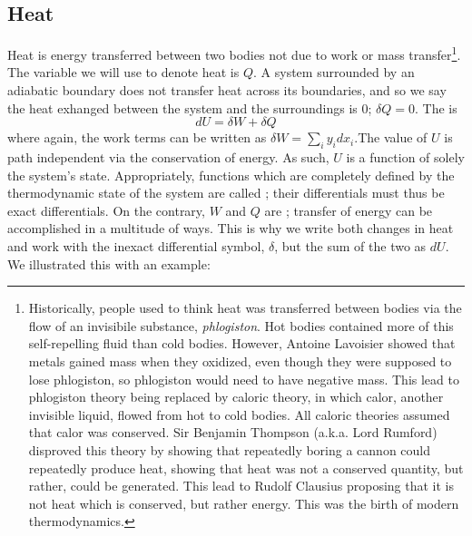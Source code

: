\documentclass[12pt]{article}
\begin{document}
\subsection{Heat}
Heat is energy transferred between two bodies not due to work or mass transfer\footnote{Historically, people used to think heat was transferred between bodies via the flow of an invisibile substance, \textit{phlogiston}. Hot bodies contained more of this self-repelling fluid than cold bodies. However, Antoine Lavoisier showed that metals gained mass when they oxidized, even though they were supposed to lose phlogiston, so phlogiston would need to have negative mass. This lead to phlogiston theory being replaced by caloric theory, in which calor, another invisible liquid, flowed from hot to cold bodies. All caloric theories assumed that calor was conserved. Sir Benjamin Thompson (a.k.a. Lord Rumford) disproved this theory by showing that repeatedly boring a cannon could repeatedly produce heat, showing that heat was not a conserved quantity, but rather, could be generated. This lead to Rudolf Clausius proposing that it is not heat which is conserved, but rather energy. This was the birth of modern thermodynamics.}.  The variable we will use to denote heat is $Q$.  A system surrounded by an adiabatic boundary does not transfer heat across its boundaries, and so we say the heat exhanged between the system and the surroundings is 0; $\delta Q = 0$.  The  is
\begin{equation}\boxed{
dU = \delta W + \delta Q
}\end{equation}
where again, the work terms can be written as $\delta W = \sum_i y_i dx_i$.The value of $U$ is path independent via the conservation of energy. As such, $U$ is a function of solely the system's state. Appropriately, functions which are completely defined by the thermodynamic state of the system are called ; their differentials must thus be exact differentials. On the contrary, $W$ and $Q$ are ; transfer of energy can be accomplished in a multitude of ways.  This is why we write both changes in heat and work with the inexact differential symbol, $\delta$, but the sum of the two as $dU$. We illustrated this with an example:
\end{document}
